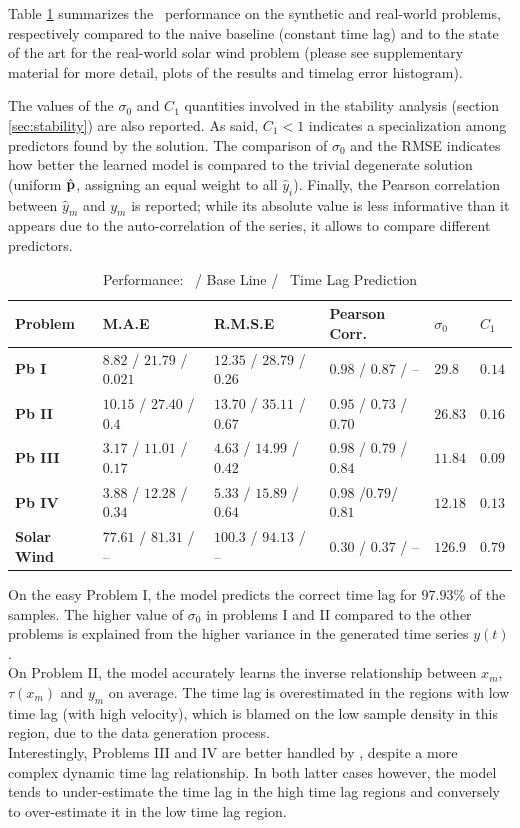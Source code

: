 Table \ref{tab:results_syn} summarizes the \XX\ performance on the synthetic and real-world problems, respectively compared to the naive baseline (constant time lag) and to the state of the art for the real-world solar wind problem (please see supplementary material for more detail, plots of the results and timelag error histogram). 

The values of the $\sigma_0$ and $C_1$ quantities involved in the stability analysis (section \ref{sec:stability}) are also reported. As said, $C_1 < 1$ indicates a specialization among predictors found by the solution. The comparison of $\sigma_0$ and the RMSE indicates how better the learned model is compared to the trivial degenerate solution (uniform $\hat {\bf p}$, assigning an equal weight to all $\hat y_i$). 
Finally, the Pearson correlation between $\hat y_m$ and $y_m$ is reported; while its absolute value is less informative than it appears due to the auto-correlation of the series, it allows to compare different predictors. 

\begin{table}
  \caption{Performance: \XX  \ / Base Line / \XX  \ Time Lag Prediction}\label{tab:results_syn}
  \centering
  \begin{tabular}{ l l l l l l}
  \hline
  Problem &  M.A.E & R.M.S.E & Pearson Corr. & $\sigma_0$ & $C_1$\\
  \hline
  \textbf{Pb I} & $8.82$ / $21.79$ / $0.021$  & $12.35$ / $28.79$ / $0.26$ & $0.98$ / $0.87$ / -- & $29.8$ & $0.14$\\
  \textbf{Pb II} & $10.15$ / $27.40$ / $0.4$ & $13.70$ / $35.11$ / $0.67$ & $0.95$ / $0.73$ / $0.70$ & $26.83$ & $0.16$\\
  \textbf{Pb III} & $3.17$ / $11.01$ / $0.17$ & $4.63$ / $14.99$ / $0.42$ & $0.98$ / $0.79$ / $0.84$ & $11.84$ & $0.09$\\
  \textbf{Pb IV} & $3.88$ / $12.28$ / $0.34$ & $5.33$ / $15.89$ / $0.64$ & $0.98$ /$0.79$/ $0.81$ & $12.18$ & $0.13$\\
  \textbf{Solar Wind} & $77.61$ / $81.31$ / -- & $100.3$ / $94.13$ / -- & $0.30$ / $0.37$ / -- & $126.9$ & $0.79$\\
  \hline
  \end{tabular}
\end{table}

On the easy Problem I, the model predicts the correct time lag for $97.93\%$ of the samples. The higher value of $\sigma_0$ in problems I and II compared to the other problems is explained from the higher variance in the generated  time series $y(t)$. \\
On Problem II, the model accurately learns the inverse relationship between $x_m$, $\tau(x_m)$ and $y_m$ on average.  The time lag is overestimated in the regions with low time lag (with high velocity), which is blamed on the low sample density in this region, due to the data generation process. \\
Interestingly, Problems III and IV are better handled by \XX, despite a more complex dynamic time lag relationship. In both latter cases however, the model tends to under-estimate the time lag in the high time lag regions and conversely to over-estimate it in the low time lag region. 

